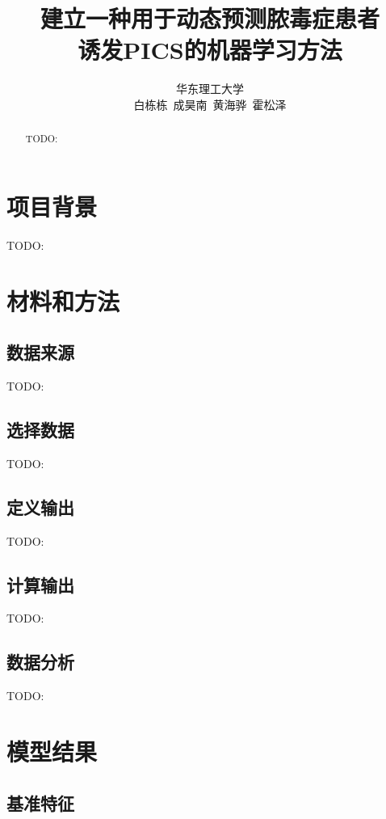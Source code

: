 \documentclass[12pt,titlepage]{article}
\title{建立一种用于动态预测脓毒症患者\\诱发PICS的机器学习方法}
\author{%
华东理工大学\\
白栋栋\ 成昊南\ 黄海骅\ 霍松泽%
}
\date{}
\begin{document}
\maketitle


\begin{abstract}
    TODO:
\end{abstract}


\tableofcontents
\newpage


\section{项目背景}

TODO:


\section{材料和方法}

\subsection{数据来源}

TODO:

\subsection{选择数据}

TODO:

\subsection{定义输出}

TODO:

\subsection{计算输出}

TODO:

\subsection{数据分析}

TODO:


\section{模型结果}

\subsection{基准特征}
\end{document}
